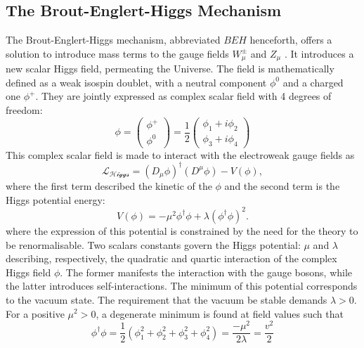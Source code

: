 \subsection{The Brout-Englert-Higgs Mechanism}
The Brout-Englert-Higgs mechanism, abbreviated $BEH$ henceforth, offers a solution to introduce mass terms to the gauge fields $W_{\mu}^{\pm}$ and $Z_{\mu}$ \cite{Englert:1964et,  PhysRevLett.13.508}. It introduces a new scalar Higgs field, permeating the Universe. The field is mathematically defined as a weak isospin doublet, with a neutral component $\phi^0$ and a charged one $\phi^+$. They are jointly expressed as complex scalar field with 4 degrees of freedom:
\begin{equation}
\phi = \begin{pmatrix}
    \phi^+\\ 
    \phi^0
\end{pmatrix} = \frac{1}{2} \begin{pmatrix}
    \phi_1 + i\phi_2 \\ 
    \phi_3 + i\phi_4
\end{pmatrix}
\end{equation}
This complex scalar field is made to interact with the electroweak gauge fields as 
\begin{equation}\label{eq-HiggsLag}
    \mathcal{L_{\text{Higgs}}} = (D_{\mu}\phi)^{\dagger} (D^{\mu}\phi) - V(\phi),
 \end{equation}
where the first term described the kinetic of the $\phi$ and the second term is the Higgs potential energy:
\begin{equation}\label{eq-HiggsLag}
 V(\phi) = - \mu^2  \phi^{\dagger} \phi + \lambda (\phi^{\dagger} \phi)^2.
\end{equation}
where the expression of this potential is constrained by the need for the theory to be renormalisable. Two scalars constants govern the Higgs potential: $\mu$ and $\lambda$ describing, respectively, the quadratic and quartic interaction of the complex Higgs field $\phi$. The former manifests the interaction with the gauge bosons, while the latter introduces self-interactions. The minimum of this potential corresponds to the vacuum state. The requirement that the vacuum be stable demands $\lambda > 0$. For a positive $\mu^2 > 0$, a degenerate minimum is found at field values such that
\begin{equation}\label{eq-HiggsLag}
    \phi^{\dagger} \phi  = \frac{1}{2} (\phi_1^2 + \phi_2^2 + \phi_3^2 + \phi_4^2) = \frac{- \mu^2}{2\lambda} = \frac{v^2}{2}
\end{equation}
